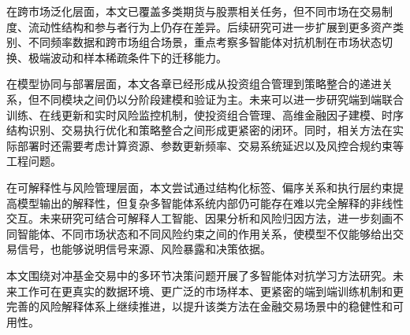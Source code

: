 在跨市场泛化层面，本文已覆盖多类期货与股票相关任务，但不同市场在交易制度、流动性结构和参与者行为上仍存在差异。后续研究可进一步扩展到更多资产类别、不同频率数据和跨市场组合场景，重点考察多智能体对抗机制在市场状态切换、极端波动和样本稀疏条件下的迁移能力。

在模型协同与部署层面，本文各章已经形成从投资组合管理到策略整合的递进关系，但不同模块之间仍以分阶段建模和验证为主。未来可以进一步研究端到端联合训练、在线更新和实时风险监控机制，使投资组合管理、高维金融因子建模、时序结构识别、交易执行优化和策略整合之间形成更紧密的闭环。同时，相关方法在实际部署时还需要考虑计算资源、参数更新频率、交易系统延迟以及风控合规约束等工程问题。

在可解释性与风险管理层面，本文尝试通过结构化标签、偏序关系和执行层约束提高模型输出的解释性，但复杂多智能体系统内部仍可能存在难以完全解释的非线性交互。未来研究可结合可解释人工智能、因果分析和风险归因方法，进一步刻画不同智能体、不同市场状态和不同风险约束之间的作用关系，使模型不仅能够给出交易信号，也能够说明信号来源、风险暴露和决策依据。

本文围绕对冲基金交易中的多环节决策问题开展了多智能体对抗学习方法研究。未来工作可在更真实的数据环境、更广泛的市场样本、更紧密的端到端训练机制和更完善的风险解释体系上继续推进，以提升该类方法在金融交易场景中的稳健性和可用性。

